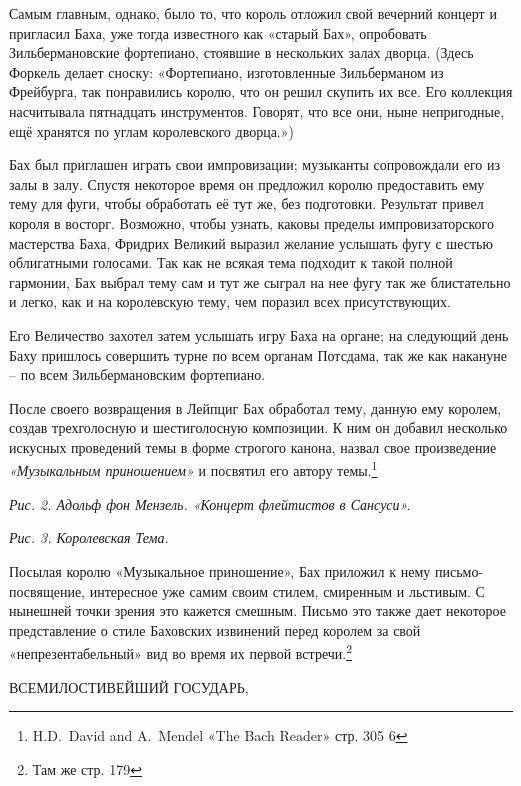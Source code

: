 \documentclass[../main.tex]{subfiles}
\begin{document}
Самым главным, однако, было то, что король отложил свой вечерний концерт и пригласил Баха, уже тогда известного как «старый Бах», опробовать Зильбермановские фортепиано, стоявшие в нескольких залах дворца. (Здесь Форкель делает сноску: «Фортепиано, изготовленные Зильберманом из Фрейбурга, так понравились королю, что он решил скупить их все. Его коллекция насчитывала пятнадцать инструментов. Говорят, что все они, ныне непригодные, ещё хранятся по углам королевского дворца.»)

Бах был приглашен играть свои импровизации; музыканты сопровождали его из залы в залу. Спустя некоторое время он предложил королю предоставить ему тему для фуги, чтобы обработать её тут же, без подготовки. Результат привел короля в восторг. Возможно, чтобы узнать, каковы пределы импровизаторского мастерства Баха, Фридрих Великий выразил желание услышать фугу с шестью облигатными голосами. Так как не всякая тема подходит к такой полной гармонии, Бах выбрал тему сам и тут же сыграл на нее фугу так же блистательно и легко, как и на королевскую тему, чем поразил всех присутствующих.

Его Величество захотел затем услышать игру Баха на органе; на следующий день Баху пришлось совершить турне по всем органам Потсдама, так же как накануне \--- по всем Зильбермановским фортепиано.

После своего возвращения в Лейпциг Бах обработал тему, данную ему королем, создав трехголосную и шестиголосную композиции. К ним он добавил несколько искусных проведений темы в форме строгого канона, назвал свое произведение \emph{«Музыкальным приношением»} и посвятил его автору темы.\footnote{H.D.~David and A.~Mendel «The Bach Reader» стр. 305 6}

\emph{Рис. 2. Адольф фон Мензель. «Концерт флейтистов в Сансуси».}

\emph{Рис. 3. Королевская Тема.}

Посылая королю «Музыкальное приношение», Бах приложил к нему письмо-посвящение, интересное уже самим своим стилем, смиренным и льстивым. С нынешней точки зрения это кажется смешным. Письмо это также дает некоторое представление о стиле Баховских извинений перед королем за свой «непрезентабельный» вид во время их первой встречи.\footnote{Там же стр. 179}

ВСЕМИЛОСТИВЕЙШИЙ ГОСУДАРЬ,
\end{document}
